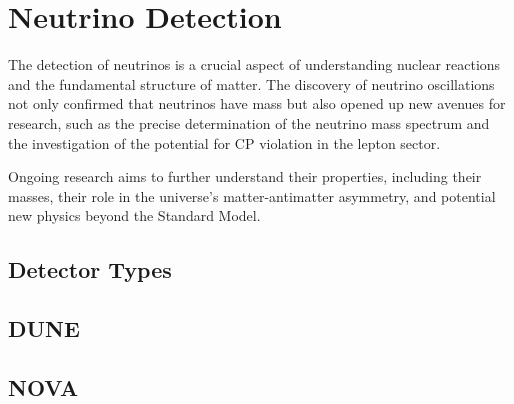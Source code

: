 \section{Neutrino Detection}

The detection of neutrinos is a crucial aspect of understanding nuclear reactions and the fundamental structure of matter.
The discovery of neutrino oscillations not only confirmed that neutrinos have mass but also opened up new avenues for research, such as the precise determination of the neutrino mass spectrum and the investigation of the potential for CP violation in the lepton sector.



Ongoing research aims to further understand their properties, including their masses, their role in the universe's matter-antimatter asymmetry, and potential new physics beyond the Standard Model.


  \subsection{Detector Types}

  \subsection{DUNE}

  \subsection{NOVA}